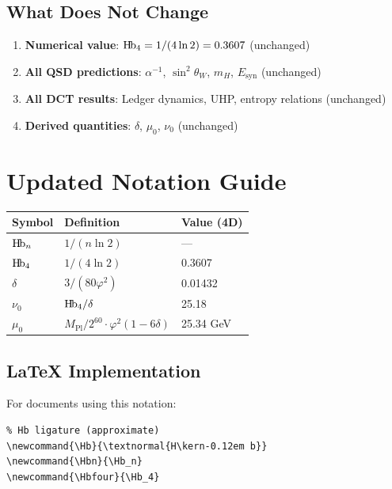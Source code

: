 \documentclass[11pt,a4paper]{article}
\newcommand{\Hb}{\textnormal{H\kern-0.12em b}}
\newcommand{\Hbn}{\Hb_n}
\newcommand{\Hbfour}{\Hb_4}
\newcommand{\dgeo}{\delta}
\newcommand{\murad}{\mu_0}
\newcommand{\Mpl}{M_{\text{Pl}}}
\begin{document}
\subsection{What Does Not Change}

\begin{enumerate}
    \item \textbf{Numerical value}: $\Hbfour = 1/(4\ln 2) = 0.3607$ (unchanged)
    
    \item \textbf{All QSD predictions}: $\alpha^{-1}$, $\sin^2\theta_W$, $m_H$, $E_{\text{syn}}$ (unchanged)
    
    \item \textbf{All DCT results}: Ledger dynamics, UHP, entropy relations (unchanged)
    
    \item \textbf{Derived quantities}: $\dgeo$, $\murad$, $\nu_0$ (unchanged)
\end{enumerate}

\section{Updated Notation Guide}
\label{sec:notation}

\begin{center}
\begin{tabular}{lll}
\toprule
\textbf{Symbol} & \textbf{Definition} & \textbf{Value (4D)} \\
\midrule
$\Hbn$ & $1/(n\ln 2)$ & --- \\
$\Hbfour$ & $1/(4\ln 2)$ & 0.3607 \\
$\dgeo$ & $3/(80\varphi^2)$ & 0.01432 \\
$\nu_0$ & $\Hbfour/\dgeo$ & 25.18 \\
$\murad$ & $\Mpl/2^{60} \cdot \varphi^2(1-6\dgeo)$ & 25.34 GeV \\
\bottomrule
\end{tabular}
\end{center}

\subsection{LaTeX Implementation}

For documents using this notation:
\begin{verbatim}
% Hb ligature (approximate)
\newcommand{\Hb}{\textnormal{H\kern-0.12em b}}
\newcommand{\Hbn}{\Hb_n}
\newcommand{\Hbfour}{\Hb_4}
\end{verbatim}
\end{document}
